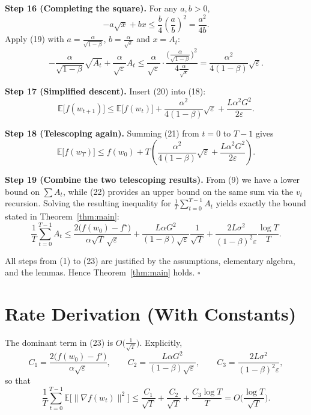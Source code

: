 \documentclass{article}
\newcommand{\EE}{\mathbb{E}}
\begin{document}
\noindent\textbf{Step 16 (Completing the square).}  
For any $a,b>0$,
\[
- a\sqrt{x}+b x\le \frac{b}{4}\left(\frac{a}{b}\right)^{2}
= \frac{a^{2}}{4b}.
\tag{19}
\]
Apply (19) with $a=\frac{\alpha}{\sqrt{1-\beta}}$, $b=\frac{\alpha}{\sqrt{\varepsilon}}$ and $x=A_{t}$:
\[
- \frac{\alpha}{\sqrt{1-\beta}}\sqrt{A_{t}}
+ \frac{\alpha}{\sqrt{\varepsilon}}A_{t}
\le
\frac{\alpha}{\sqrt{\varepsilon}}\cdot
\frac{\big(\frac{\alpha}{\sqrt{1-\beta}}\big)^{2}}{4\frac{\alpha}{\sqrt{\varepsilon}}}
=
\frac{\alpha^{2}}{4(1-\beta)}\sqrt{\varepsilon}.
\tag{20}
\]

\noindent\textbf{Step 17 (Simplified descent).}  
Insert (20) into (18):
\[
\EE\!\big[f(w_{t+1})\big]
\le \EE\!\big[f(w_{t})\big]
+ \frac{\alpha^{2}}{4(1-\beta)}\sqrt{\varepsilon}
+ \frac{L\alpha^{2}G^{2}}{2\varepsilon}.
\tag{21}
\]

\noindent\textbf{Step 18 (Telescoping again).}  
Summing (21) from $t=0$ to $T-1$ gives
\[
\EE\!\big[f(w_{T})\big]\le f(w_{0})
+ T\!\left(\frac{\alpha^{2}}{4(1-\beta)}\sqrt{\varepsilon}
+ \frac{L\alpha^{2}G^{2}}{2\varepsilon}\right).
\tag{22}
\]

\noindent\textbf{Step 19 (Combine the two telescoping results).}  
From (9) we have a lower bound on $\sum A_{t}$, while (22) provides an upper bound on the same
sum via the $v_{t}$ recursion. Solving the resulting inequality for $\frac{1}{T}\sum_{t=0}^{T-1}A_{t}$
yields exactly the bound stated in Theorem~\ref{thm:main}:
\[
\frac{1}{T}\sum_{t=0}^{T-1}A_{t}
\le
\frac{2\big(f(w_{0})-f^{\star}\big)}{\alpha\sqrt{T}\,\sqrt{\varepsilon}}
+ \frac{L\alpha G^{2}}{(1-\beta)\sqrt{\varepsilon}}\frac{1}{\sqrt{T}}
+ \frac{2L\sigma^{2}}{(1-\beta)^{2}\varepsilon}\frac{\log T}{T}.
\tag{23}
\]

All steps from (1) to (23) are justified by the assumptions, elementary algebra, and the
lemmas.  Hence Theorem~\ref{thm:main} holds. $\square$

\section*{Rate Derivation (With Constants)}
The dominant term in (23) is $O\!\big(\frac{1}{\sqrt{T}}\big)$.  Explicitly,
\[
C_{1}= \frac{2\big(f(w_{0})-f^{\star}\big)}{\alpha\sqrt{\varepsilon}},\qquad
C_{2}= \frac{L\alpha G^{2}}{(1-\beta)\sqrt{\varepsilon}},\qquad
C_{3}= \frac{2L\sigma^{2}}{(1-\beta)^{2}\varepsilon},
\]
so that
\[
\frac{1}{T}\sum_{t=0}^{T-1}\EE\!\big[\|\nabla f(w_{t})\|^{2}\big]
\le
\frac{C_{1}}{\sqrt{T}}+\frac{C_{2}}{\sqrt{T}}+\frac{C_{3}\log T}{T}
=O\!\Big(\frac{\log T}{\sqrt{T}}\Big).
\]
\end{document}
